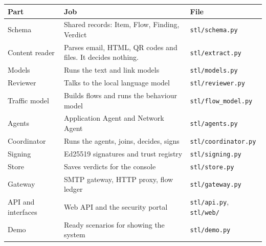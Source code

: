 \documentclass[11pt,a4paper]{article}
\newcommand{\code}[1]{\texttt{#1}}
\newcommand{\need}[1][10]{\Needspace{#1\baselineskip}}
\newenvironment{fig}[2]{\par\medskip\noindent\begin{minipage}{\linewidth}\centering
  \refstepcounter{figure}\label{#2}\def\figtext{#1}}
  {\par\vspace{5pt}{\small Figure~\thefigure: \figtext\par}\end{minipage}\par\medskip}
\begin{document}
\begin{fig}{Prototype system architecture.}{fig:arch}
\end{fig}

\need[16]
\begin{center}
\begin{tabularx}{\linewidth}{P{3.3cm}YP{3.7cm}}
\toprule
\textbf{Part} & \textbf{Job} & \textbf{File} \\
\midrule
Schema & Shared records: Item, Flow, Finding, Verdict & \code{stl/schema.py} \\
Content reader & Parses email, HTML, QR codes and files. It decides nothing. & \code{stl/extract.py} \\
Models & Runs the text and link models & \code{stl/models.py} \\
Reviewer & Talks to the local language model & \code{stl/reviewer.py} \\
Traffic model & Builds flows and runs the behaviour model & \code{stl/flow\_model.py} \\
Agents & Application Agent and Network Agent & \code{stl/agents.py} \\
Coordinator & Runs the agents, joins, decides, signs & \code{stl/coordinator.py} \\
Signing & Ed25519 signatures and trust registry & \code{stl/signing.py} \\
Store & Saves verdicts for the console & \code{stl/store.py} \\
Gateway & SMTP gateway, HTTP proxy, flow ledger & \code{stl/gateway.py} \\
API and interfaces & Web API and the security portal & \code{stl/api.py}, \code{stl/web/} \\
Demo & Ready scenarios for showing the system & \code{stl/demo.py} \\
\bottomrule
\end{tabularx}
\end{center}
\end{document}
